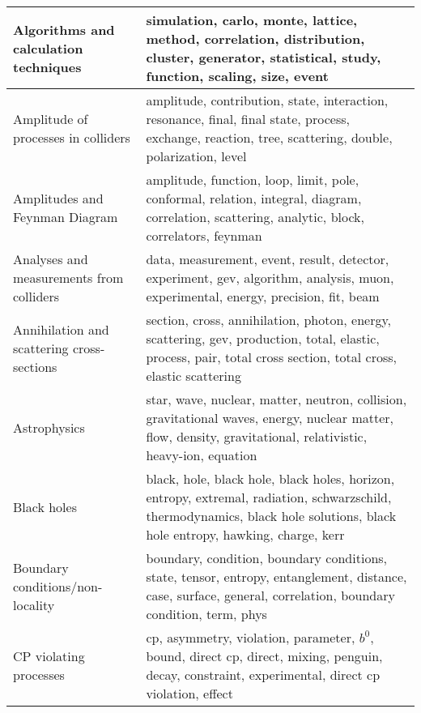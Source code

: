 \begin{longtable}[H]{p{}|p{}}
\bottomrule
\endlastfoot
Algorithms and calculation techniques               &                                                               simulation, carlo, monte, lattice, method, correlation, distribution, cluster, generator, statistical, study, function, scaling, size, event \\ \midrule
Amplitude of processes in colliders                 &                                                     amplitude, contribution, state, interaction, resonance, final, final state, process, exchange, reaction, tree, scattering, double, polarization, level \\ \midrule
Amplitudes and Feynman Diagram                      &                                                             amplitude, function, loop, limit, pole, conformal, relation, integral, diagram, correlation, scattering, analytic, block, correlators, feynman \\ \midrule
Analyses and measurements from colliders            &                                                                         data, measurement, event, result, detector, experiment, gev, algorithm, analysis, muon, experimental, energy, precision, fit, beam \\ \midrule
Annihilation and scattering cross-sections          &                                             section, cross, annihilation, photon, energy, scattering, gev, production, total, elastic, process, pair, total cross section, total cross, elastic scattering \\ \midrule
Astrophysics                                        &                                              star, wave, nuclear, matter, neutron, collision, gravitational waves, energy, nuclear matter, flow, density, gravitational, relativistic, heavy-ion, equation \\ \midrule
Black holes                                         &                                black, hole, black hole, black holes, horizon, entropy, extremal, radiation, schwarzschild, thermodynamics, black hole solutions, black hole entropy, hawking, charge, kerr \\ \midrule
Boundary conditions/non-locality                    &                                              boundary, condition, boundary conditions, state, tensor, entropy, entanglement, distance, case, surface, general, correlation, boundary condition, term, phys \\ \midrule
CP violating processes                              &                                                        cp, asymmetry, violation, parameter, $b^0$, bound, direct cp, direct, mixing, penguin, decay, constraint, experimental, direct cp violation, effect \\ \midrule

\end{longtable}
